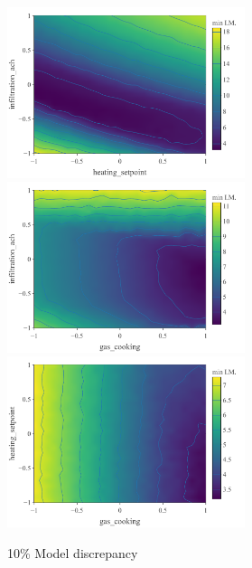 \documentclass[a4paper, 12pt]{article}
\begin{document}
\renewcommand{\scale}{18.8em}
\begin{figure}
\centering
 \includegraphics[width=\scale]{Gas_Compatibility/Min_Impl/minImpl_MD=10_x=1_y=6}
 \includegraphics[width=\scale]{Gas_Compatibility/Min_Impl/minImpl_MD=10_x=8_y=6}\\
 \hspace{\scale}
  \includegraphics[width=\scale]{Gas_Compatibility/Min_Impl/minImpl_MD=10_x=8_y=1}
 \caption{10\% Model discrepancy}
 \label{Fig_Min_Implaus_10MD}
\end{figure}
\end{document}
